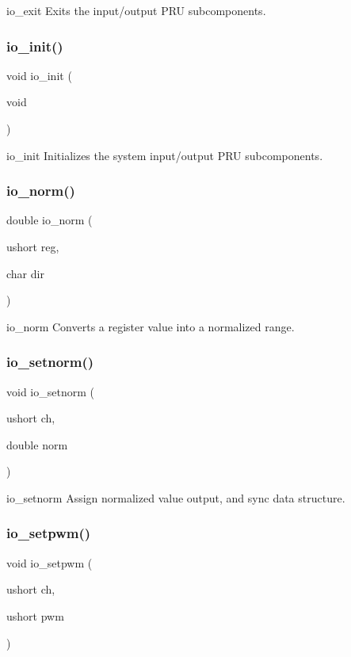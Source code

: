 io\+\_\+exit Exits the input/output P\+RU subcomponents. \mbox{\label{io_8c_a43bba613ce0efd6af387cd04458ede8d}} 
\subsubsection{io\+\_\+init()}
{\footnotesize\ttfamily void io\+\_\+init (\begin{DoxyParamCaption}\item[{void}]{ }\end{DoxyParamCaption})}

io\+\_\+init Initializes the system input/output P\+RU subcomponents. \mbox{\label{io_8c_aec4d35a5bb87394b3d93df48341a4593}} 
\subsubsection{io\+\_\+norm()}
{\footnotesize\ttfamily double io\+\_\+norm (\begin{DoxyParamCaption}\item[{ushort}]{reg,  }\item[{char}]{dir }\end{DoxyParamCaption})}

io\+\_\+norm Converts a register value into a normalized range. \mbox{\label{io_8c_aeaceb85e7c7a6699293c41cd705d85ec}} 
\subsubsection{io\+\_\+setnorm()}
{\footnotesize\ttfamily void io\+\_\+setnorm (\begin{DoxyParamCaption}\item[{ushort}]{ch,  }\item[{double}]{norm }\end{DoxyParamCaption})}

io\+\_\+setnorm Assign normalized value output, and sync data structure. \mbox{\label{io_8c_a191ff0f457d740faf9e13fb75b6efc9e}} 
\subsubsection{io\+\_\+setpwm()}
{\footnotesize\ttfamily void io\+\_\+setpwm (\begin{DoxyParamCaption}\item[{ushort}]{ch,  }\item[{ushort}]{pwm }\end{DoxyParamCaption})}

